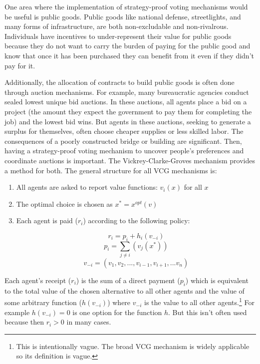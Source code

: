 \documentclass{amsart}
\theoremstyle{plain}
\begin{document}
One area where the implementation of strategy-proof voting mechanisms would be useful is public goods.  Public goods like national defense, streetlights, and many forms of infrastructure, are both non-excludable and non-rivalrous. Individuals have incentives to under-represent their value for public goods because they do not want to carry the burden of paying for the public good and know that once it has been purchased they can benefit from it even if they didn't pay for it. 

Additionally, the allocation of contracts to build public goods is often done through auction mechanisms. For example, many bureaucratic agencies conduct sealed lowest unique bid auctions. In these auctions, all agents place a bid on a project (the amount they expect the government to pay them for completing the job) and the lowest bid wins. But agents in these auctions, seeking to generate a surplus for themselves, often choose cheaper supplies or less skilled labor. The consequences of a poorly constructed bridge or building are significant. Then, having a strategy-proof voting mechanism to uncover people's preferences and coordinate auctions is important. The Vickrey-Clarke-Groves mechanism provides a method for both. \cite{Wiki} The general structure for all VCG mechanisms is:

\vskip 0.25cm

\begin{enumerate}
    \item All agents are asked to report value functions: $v_i(x)$ for all $x$
    \item The optimal choice is chosen as $x^* = x^{opt}(v)$
    \item Each agent is paid ($r_i$) according to the following policy:


    \begin{equation*}
        r_i = p_i + h_i(v_{-i})
    \end{equation*}
    \begin{equation*}
        p_i = \sum_{j \ne i}(v_j(x^*))
    \end{equation*}
    \begin{equation*}
        v_{-i} = (v_1, v_2, ... , v_{i-1}, v_{i+1}, ... v_n)
    \end{equation*}
\end{enumerate}

\vskip 0.25cm

Each agent's receipt ($r_i$) is the sum of a direct payment ($p_i$) which is equivalent to the total value of the chosen alternative to all other agents and the value of some arbitrary function ($h(v_{-i})$) where $v_{-i}$ is the value to all other agents.\footnote{This is intentionally vague. The broad VCG mechanism is widely applicable so its definition is vague.} For example $h(v_{-i}) = 0$ is one option for the function $h$. But this isn't often used because then $r_i >0$ in many cases.
\end{document}
